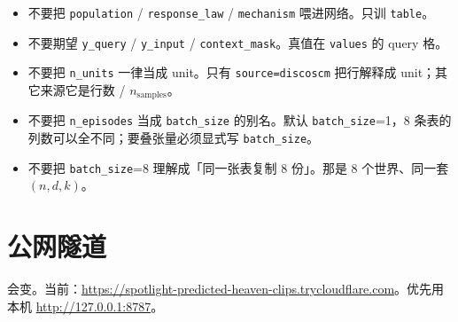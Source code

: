 \documentclass[11pt,a4paper,fontset=none]{ctexart}
\begin{document}
\begin{itemize}
  \item 不要把 \texttt{population} / \texttt{response\_law} / \texttt{mechanism} 喂进网络。只训 \texttt{table}。
  \item 不要期望 \texttt{y\_query} / \texttt{y\_input} / \texttt{context\_mask}。真值在 \texttt{values} 的 query 格。
  \item 不要把 \texttt{n\_units} 一律当成 unit。只有 \texttt{source=discoscm} 把行解释成 unit；其它来源它是行数 / $n_{\mathrm{samples}}$。
  \item 不要把 \texttt{n\_episodes} 当成 \texttt{batch\_size} 的别名。默认 \texttt{batch\_size}=1，8 条表的列数可以全不同；要叠张量必须显式写 \texttt{batch\_size}。
  \item 不要把 \texttt{batch\_size}=8 理解成「同一张表复制 8 份」。那是 8 个世界、同一套 $(n,d,k)$。
\end{itemize}

\appendix
\section{公网隧道}
\label{app:tunnel}

会变。当前：\url{https://spotlight-predicted-heaven-clips.trycloudflare.com}。优先用本机 \url{http://127.0.0.1:8787}。
\end{document}
